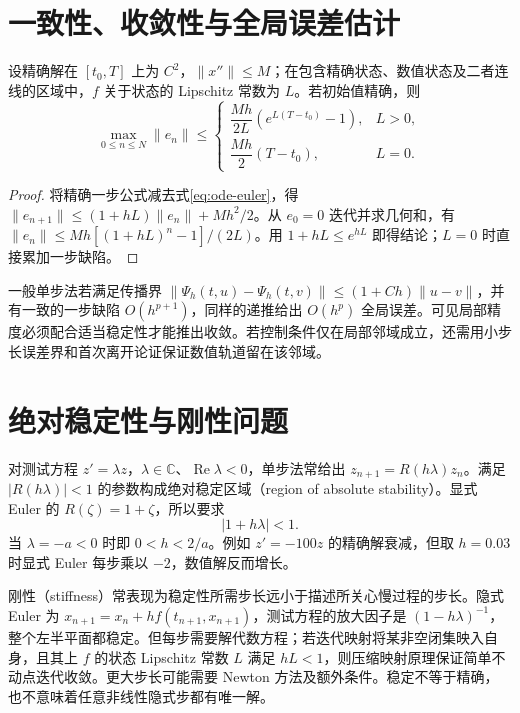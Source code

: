 \documentclass[UTF8,12pt,a4paper,fontset=fandol]{ctexbook}
\begin{document}
\section{一致性、收敛性与全局误差估计}
\begin{theorem}
设精确解在 $[t_0,T]$ 上为 $C^2$，$\|x''\|\leq M$；在包含精确状态、数值状态及二者连线的区域中，$f$ 关于状态的 Lipschitz 常数为 $L$。若初始值精确，则
\[
 \max_{0\leq n\leq N}\|e_n\|\leq
 \begin{cases}\dfrac{Mh}{2L}(e^{L(T-t_0)}-1),&L>0,\\
 \dfrac{Mh}{2}(T-t_0),&L=0.
 \end{cases}
\]
\end{theorem}
\begin{proof}
将精确一步公式减去式\eqref{eq:ode-euler}，得 $\|e_{n+1}\|\leq(1+hL)\|e_n\|+Mh^2/2$。从 $e_0=0$ 迭代并求几何和，有 $\|e_n\|\leq Mh[(1+hL)^n-1]/(2L)$。用 $1+hL\leq e^{hL}$ 即得结论；$L=0$ 时直接累加一步缺陷。
\end{proof}

一般单步法若满足传播界 $\|\Psi_h(t,u)-\Psi_h(t,v)\|\leq(1+Ch)\|u-v\|$，并有一致的一步缺陷 $O(h^{p+1})$，同样的递推给出 $O(h^p)$ 全局误差。可见局部精度必须配合适当稳定性才能推出收敛。若控制条件仅在局部邻域成立，还需用小步长误差界和首次离开论证保证数值轨道留在该邻域。

\section{绝对稳定性与刚性问题}
对测试方程 $z'=\lambda z$，$\lambda\in\mathbb C$、$\operatorname{Re}\lambda<0$，单步法常给出 $z_{n+1}=R(h\lambda)z_n$。满足 $|R(h\lambda)|<1$ 的参数构成绝对稳定区域（region of absolute stability）。显式 Euler 的 $R(\zeta)=1+\zeta$，所以要求
\[
 |1+h\lambda|<1.
\]
当 $\lambda=-a<0$ 时即 $0<h<2/a$。例如 $z'=-100z$ 的精确解衰减，但取 $h=0.03$ 时显式 Euler 每步乘以 $-2$，数值解反而增长。

刚性（stiffness）常表现为稳定性所需步长远小于描述所关心慢过程的步长。隐式 Euler 为 $x_{n+1}=x_n+hf(t_{n+1},x_{n+1})$，测试方程的放大因子是 $(1-h\lambda)^{-1}$，整个左半平面都稳定。但每步需要解代数方程；若迭代映射将某非空闭集映入自身，且其上 $f$ 的状态 Lipschitz 常数 $L$ 满足 $hL<1$，则压缩映射原理保证简单不动点迭代收敛。更大步长可能需要 Newton 方法及额外条件。稳定不等于精确，也不意味着任意非线性隐式步都有唯一解。
\end{document}
